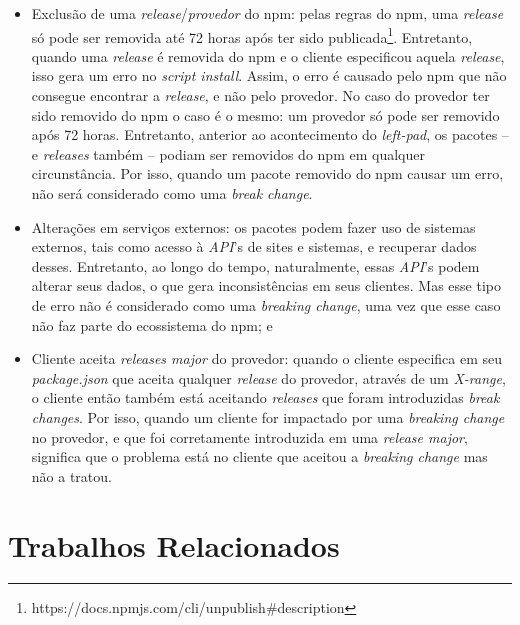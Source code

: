 \begin{itemize}
    \item Exclusão de uma \textit{release}/\textit{provedor} do \gls{npm}: pelas regras do \gls{npm}, uma \textit{release} só pode ser removida até 72 horas após ter sido publicada\footnote{https://docs.npmjs.com/cli/unpublish\#description}. Entretanto, quando uma \textit{release} é removida do \gls{npm} e o cliente especificou aquela \textit{release}, isso gera um erro no \textit{script install}. Assim, o erro é causado pelo \gls{npm} que não consegue encontrar a \textit{release}, e não pelo provedor. No caso do provedor ter sido removido do \gls{npm} o caso é o mesmo: um provedor só pode ser removido após 72 horas. Entretanto, anterior ao acontecimento do \textit{left-pad}, os pacotes -- e \textit{releases} também -- podiam ser removidos do \gls{npm} em qualquer circunstância. Por isso, quando um pacote removido do \gls{npm} causar um erro, não será considerado como uma \textit{break change}.
    \item Alterações em serviços externos: os pacotes podem fazer uso de sistemas externos, tais como acesso à \textit{API}'s de sites e sistemas, e recuperar dados desses. Entretanto, ao longo do tempo, naturalmente, essas \textit{API}'s podem alterar seus dados, o que gera inconsistências em seus clientes. Mas esse tipo de erro não é considerado como uma \textit{breaking change}, uma vez que esse caso não faz parte do ecossistema do \gls{npm}; e
    \item Cliente aceita \textit{releases major} do provedor: quando o cliente especifica em seu \textit{package.json} que aceita qualquer \textit{release} do provedor, através de um \textit{X-range}, o cliente então também está aceitando \textit{releases} que foram introduzidas \textit{break changes}. Por isso, quando um cliente for impactado por uma \textit{breaking change} no provedor, e que foi corretamente introduzida em uma \textit{release major}, significa que o problema está no cliente que aceitou a \textit{breaking change} mas não a tratou.
\end{itemize}{}

\section{Trabalhos Relacionados}
\label{sec:related_works}

